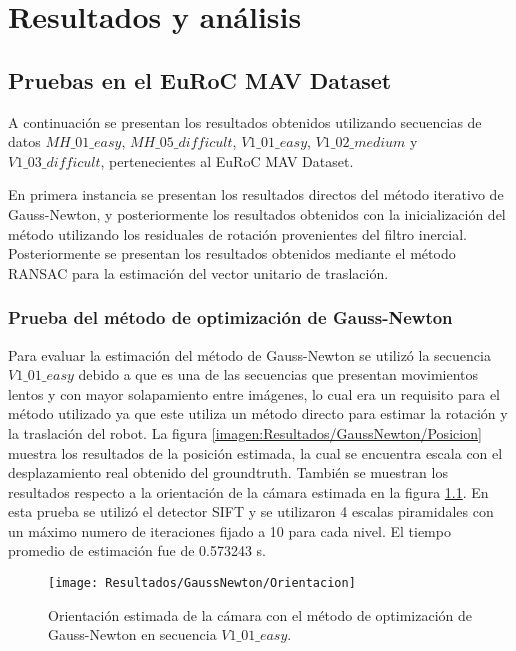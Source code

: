 \chapter{Resultados y análisis}
\label{capitulo4}

\section{Pruebas en el EuRoC MAV Dataset}
A continuación se presentan los resultados obtenidos
utilizando secuencias de datos  $MH\_ 01\_ easy$,  $MH\_ 05\_ difficult$,  $V1\_ 01\_ easy$,
$V1\_ 02\_ medium$ y  $V1\_ 03\_ difficult$, pertenecientes al EuRoC MAV Dataset.

En primera instancia se presentan los resultados directos del método iterativo de Gauss-Newton, y posteriormente los resultados obtenidos con la inicialización del método utilizando los residuales de rotación provenientes del filtro inercial. Posteriormente se presentan los resultados obtenidos mediante el método RANSAC para la estimación del vector unitario de traslación.


\subsection{Prueba del método de optimización de Gauss-Newton }

Para evaluar la estimación del método de Gauss-Newton se utilizó la secuencia $V1\_ 01\_ easy$ debido a que es una de las secuencias que presentan movimientos lentos y con mayor solapamiento entre imágenes, lo cual era un requisito para el método utilizado ya que este utiliza un método directo para estimar la rotación y la traslación del robot. La figura \ref{imagen:Resultados/GaussNewton/Posicion} muestra los resultados de la posición estimada, la cual se encuentra escala con el desplazamiento real obtenido del groundtruth. También se muestran los resultados respecto a la orientación de la cámara estimada en la figura \ref{imagen:Resultados/GaussNewton/Orientacion}. En esta prueba se utilizó el detector SIFT y se utilizaron 4 escalas piramidales con un máximo numero de iteraciones fijado a 10 para cada nivel. El tiempo promedio de estimación fue de 0.573243 s.

\begin{figure}[H]
	\centering
	\texttt{[image: Resultados/GaussNewton/Orientacion]}
	\caption{Orientación estimada de la cámara con el método de optimización de Gauss-Newton en secuencia $V1\_ 01\_ easy$. }
	\label{imagen:Resultados/GaussNewton/Orientacion}
\end{figure}

